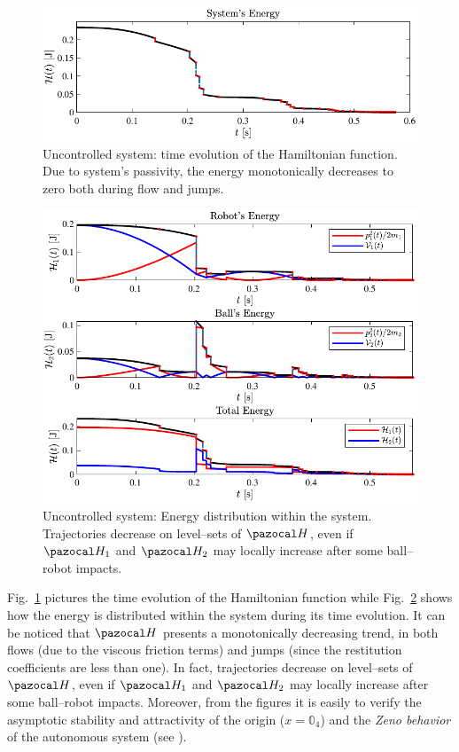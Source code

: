 \begin{figure}[ht!]
	\centering
	\includegraphics[width=\linewidth]{Figures/aut3.pdf}
	\caption[Uncontrolled system: time evolution of the Hamiltonian function]{Uncontrolled system: time evolution of the Hamiltonian function. Due to system's passivity, the energy monotonically decreases to zero both during flow and jumps.}
	\label{fig:aut3}
\end{figure}
%
\begin{figure}[hb!]
	\centering
	\includegraphics[width=\linewidth]{Figures/aut4.pdf}
	\caption[Uncontrolled system: Energy distribution within the system]{Uncontrolled system: Energy distribution within the system. Trajectories decrease on  level--sets of $\Ha$, even if $\Ha_1$ and $\Ha_2$ may locally increase after some ball--robot impacts.}
	\label{fig:aut4}
\end{figure}
Fig.~\ref{fig:aut3} pictures  the time evolution of the Hamiltonian function while Fig.~\ref{fig:aut4} shows how the energy is distributed within the system during its time evolution.
It can be noticed that $\Ha$ presents a monotonically decreasing trend, in both flows (due to the viscous friction terms) and jumps (since the restitution coefficients are less than one). In fact, trajectories decrease on level--sets of $\Ha$, even if $\Ha_1$ and $\Ha_2$ may locally increase after some ball--robot impacts. Moreover, from the figures it is easily to verify the asymptotic stability and attractivity of the origin ($x = \mathbb{0}_4$) and the \textit{Zeno behavior} of the autonomous system (see \cite{goebel2009hybrid}).


